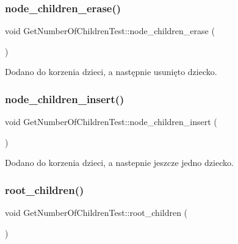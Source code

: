 \subsubsection{\texorpdfstring{node\+\_\+children\+\_\+erase()}{node\_children\_erase()}}
{\footnotesize\ttfamily void Get\+Number\+Of\+Children\+Test\+::node\+\_\+children\+\_\+erase (\begin{DoxyParamCaption}{ }\end{DoxyParamCaption})\hspace{0.3cm}{\ttfamily [inline]}}

Dodano do korzenia dzieci, a następnie usunięto dziecko. \mbox{\label{class_get_number_of_children_test_a0930a6f25c1f9d47424aab20a1733eb3}} 
\subsubsection{\texorpdfstring{node\+\_\+children\+\_\+insert()}{node\_children\_insert()}}
{\footnotesize\ttfamily void Get\+Number\+Of\+Children\+Test\+::node\+\_\+children\+\_\+insert (\begin{DoxyParamCaption}{ }\end{DoxyParamCaption})\hspace{0.3cm}{\ttfamily [inline]}}

Dodano do korzenia dzieci, a nastepnie jeszcze jedno dziecko. \mbox{\label{class_get_number_of_children_test_abf650bd374f47d9687109fb0022e5f21}} 
\subsubsection{\texorpdfstring{root\+\_\+children()}{root\_children()}}
{\footnotesize\ttfamily void Get\+Number\+Of\+Children\+Test\+::root\+\_\+children (\begin{DoxyParamCaption}{ }\end{DoxyParamCaption})\hspace{0.3cm}{\ttfamily [inline]}}

